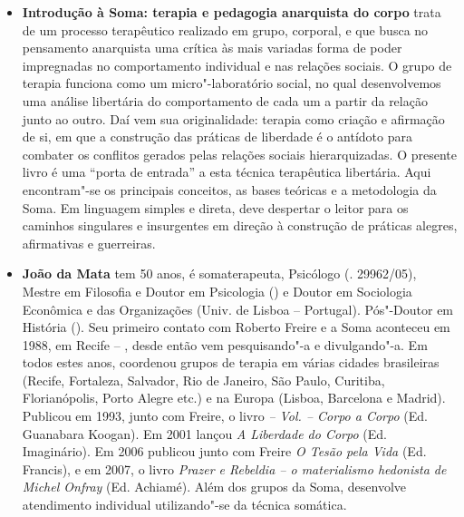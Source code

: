 \begin{itemize}
\item \textbf{Introdução à Soma: terapia e pedagogia anarquista do corpo} trata de um processo terapêutico realizado em grupo, corporal, e que busca no pensamento anarquista uma crítica às mais variadas forma de poder impregnadas no comportamento individual e nas relações sociais.
O grupo de terapia funciona como um micro"-laboratório social, no qual desenvolvemos uma análise libertária do comportamento de cada um a partir da relação junto ao outro. Daí vem sua originalidade: terapia como criação e afirmação de si, em que a construção das práticas de liberdade é o antídoto para combater os conflitos gerados pelas relações sociais hierarquizadas.
O presente livro é uma ``porta de entrada'' a esta técnica terapêutica libertária. Aqui encontram"-se os principais conceitos, as bases teóricas e a metodologia da Soma. Em linguagem simples e direta, deve despertar o leitor para os caminhos singulares e insurgentes em direção à construção de práticas alegres, afirmativas e guerreiras.
  
\item \textbf{João da Mata} tem 50 anos, é somaterapeuta, Psicólogo (. 29962/05), Mestre em Filosofia e Doutor em Psicologia () e Doutor em Sociologia Econômica e das Organizações (Univ. de Lisboa -- Portugal). Pós"-Doutor em História ().
Seu primeiro contato com Roberto Freire e a Soma aconteceu em 1988, em Recife -- , desde então vem pesquisando"-a e divulgando"-a. Em todos estes anos, coordenou grupos de terapia em várias cidades brasileiras
(Recife, Fortaleza, Salvador, Rio de Janeiro, São Paulo, Curitiba, Florianópolis, Porto Alegre etc.) e na Europa (Lisboa, Barcelona e Madrid).
Publicou em 1993, junto com Freire, o livro \emph{ -- Vol.  -- Corpo a Corpo} (Ed. Guanabara Koogan). Em 2001 lançou \emph{A Liberdade do Corpo} (Ed. Imaginário). Em 2006 publicou junto com Freire \emph{O Tesão pela Vida} (Ed. Francis), e em 2007, o livro \emph{Prazer e Rebeldia -- o materialismo hedonista de Michel Onfray} (Ed. Achiamé).
Além dos grupos da Soma, desenvolve atendimento individual utilizando"-se da técnica somática.

\end{itemize}

